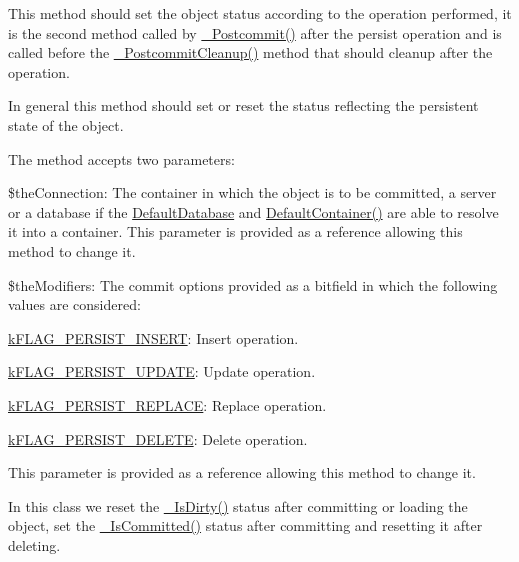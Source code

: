 This method should set the object status according to the operation performed, it is the second method called by \hyperlink{class_c_persistent_document_aa7fdfe47ee3099ebda49a76e1fa24670}{\-\_\-\-Postcommit()} after the persist operation and is called before the \hyperlink{class_c_persistent_document_a649e5b01c3e3c2d9ab0d99cff6b3349f}{\-\_\-\-Postcommit\-Cleanup()} method that should cleanup after the operation.

In general this method should set or reset the status reflecting the persistent state of the object.

The method accepts two parameters\-:


\begin{DoxyItemize}
\item {\ttfamily \$the\-Connection}\-: The container in which the object is to be committed, a server or a database if the \hyperlink{class_c_persistent_document_a6092e640e36485873b70a79db464e0ff}{Default\-Database} and \hyperlink{class_c_persistent_document_ada019252d242b5a88a26b82a18e29ed6}{Default\-Container()} are able to resolve it into a container. This parameter is provided as a reference allowing this method to change it. 
\item {\ttfamily \$the\-Modifiers}\-: The commit options provided as a bitfield in which the following values are considered\-: 
\begin{DoxyItemize}
\item {\ttfamily \hyperlink{}{k\-F\-L\-A\-G\-\_\-\-P\-E\-R\-S\-I\-S\-T\-\_\-\-I\-N\-S\-E\-R\-T}}\-: Insert operation. 
\item {\ttfamily \hyperlink{}{k\-F\-L\-A\-G\-\_\-\-P\-E\-R\-S\-I\-S\-T\-\_\-\-U\-P\-D\-A\-T\-E}}\-: Update operation. 
\item {\ttfamily \hyperlink{}{k\-F\-L\-A\-G\-\_\-\-P\-E\-R\-S\-I\-S\-T\-\_\-\-R\-E\-P\-L\-A\-C\-E}}\-: Replace operation. 
\item {\ttfamily \hyperlink{}{k\-F\-L\-A\-G\-\_\-\-P\-E\-R\-S\-I\-S\-T\-\_\-\-D\-E\-L\-E\-T\-E}}\-: Delete operation. 
\end{DoxyItemize}This parameter is provided as a reference allowing this method to change it. 
\end{DoxyItemize}

In this class we reset the \hyperlink{class_c_status_document_ad5193995e1bff6de09acf3248a232ef9}{\-\_\-\-Is\-Dirty()} status after committing or loading the object, set the \hyperlink{class_c_status_document_ab7d96fd4588cf7d5432fc65a1d1fb076}{\-\_\-\-Is\-Committed()} status after committing and resetting it after deleting.


